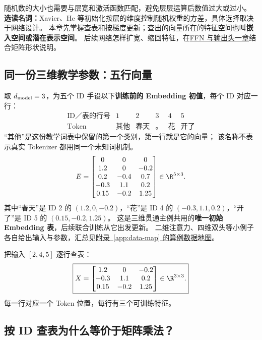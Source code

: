 随机数的大小也需要与层宽和激活函数匹配，避免层层运算后数值过大或过小。
\textbf{选读名词：}Xavier、He 等初始化按层的维度控制随机权重的方差，具体选择取决于网络设计。
本章先掌握查表和按梯度更新；查出的向量所在的特征空间也叫\textbf{嵌入空间或潜在表示空间}。
后续网络怎样扩宽、缩回特征，在\hyperref[intro:10b-ffn-output-head]{FFN 与输出头一章}结合矩阵形状说明。

\subsection{同一份三维教学参数：五行向量}

取 $d_{\rm model}=3$，为五个 ID 手设以下\textbf{训练前的 Embedding 初值}，每个 ID 对应一行：
\[
\begin{array}{c|ccccc}
\text{ID／表的行号}&1&2&3&4&5\\\hline
\text{Token}&\text{其他}&\text{春天}&\text{。}&\text{花}&\text{开了}
\end{array}
\]
“其他”是这份教学词表中保留的第一个类别，第一行就是它的向量；
该名称不表示真实 Tokenizer 都用同一个未知词机制。
\[
E=\begin{bmatrix}
0&0&0\\
1.2&0&-0.2\\
0.2&-0.4&0.7\\
-0.3&1.1&0.2\\
0.15&-0.2&1.25
\end{bmatrix}\in\R^{5\times3}.
\]
其中“春天”是 ID 2 的 $(1.2,0,-0.2)$，“花”是 ID 4 的
$(-0.3,1.1,0.2)$，“开了”是 ID 5 的 $(0.15,-0.2,1.25)$。
这是三维贯通主例共用的\textbf{唯一初始 Embedding 表}，后续联合训练从它出发更新。
二维注意力、四维双头等小例子各自给出输入与参数，汇总见\hyperref[app:data-map]{附录~\ref*{app:data-map} 的算例数据地图}。

把输入 $[2,4,5]$ 逐行查表：
\begin{equation}
\boxed{
X=\begin{bmatrix}
1.2&0&-0.2\\
-0.3&1.1&0.2\\
0.15&-0.2&1.25
\end{bmatrix}\in\R^{3\times3}.
}
\label{eq:running-embedding}
\end{equation}
每一行对应一个 Token 位置，每行有三个可训练特征。



\subsection{按 ID 查表为什么等价于矩阵乘法？}

